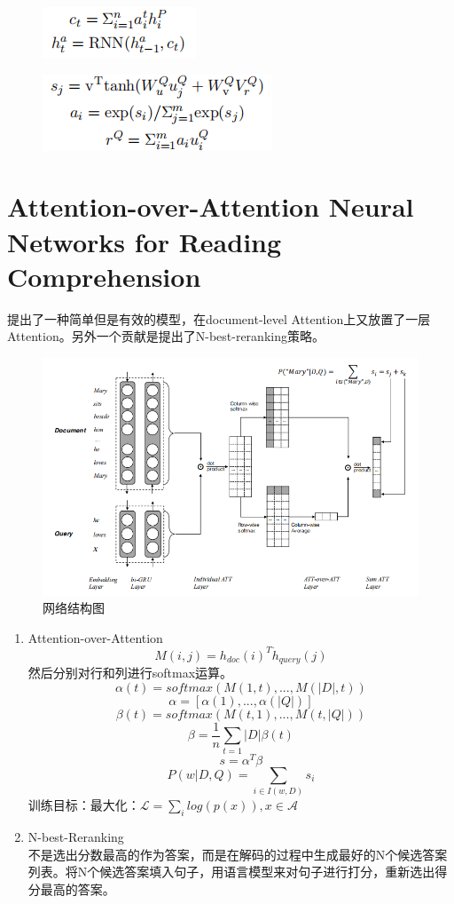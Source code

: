 \documentclass[a4paper,UTF8]{article}
\numberwithin{equation}{section}
\begin{document}
\begin{enumerate}
	\begin{figure}[H]
		\centering
		\includegraphics[]{4-3.png}
	\end{figure}
	\begin{figure}[H]
		\centering
		\includegraphics[]{4-4.png}
	\end{figure}
	
\end{enumerate}
\newpage
\section{Attention-over-Attention Neural Networks for Reading Comprehension}
提出了一种简单但是有效的模型，在document-level Attention上又放置了一层Attention。另外一个贡献是提出了N-best-reranking策略。
\begin{figure}[H]
	\centering
	\includegraphics[width=\textwidth]{5-1.png}
	\caption{网络结构图}
\end{figure}
\begin{enumerate}
	\item Attention-over-Attention\\
	$$M(i,j)=h_{doc}(i)^T\dot h_{query}(j)$$
	然后分别对行和列进行softmax运算。
	$$ \alpha(t)= softmax(M(1, t), ..., M(|D|, t)) $$
	$$ \alpha =[\alpha(1),...,\alpha(|Q|)]$$
	$$\beta(t) = sof tmax(M(t, 1), ..., M(t, |Q|))$$
	$$\beta = \frac{1}{n}\sum_{t=1}{|D|}\beta(t)$$
	$$s=\alpha^T\beta$$
	$$P(w|D, Q) = \sum_{i \in I(w,D)}s_i$$
	训练目标：最大化：$\mathcal{L}=\sum_i log(p(x)),x\in \mathcal{A}$
	\item N-best-Reranking\\
	不是选出分数最高的作为答案，而是在解码的过程中生成最好的N个候选答案列表。将N个候选答案填入句子，用语言模型来对句子进行打分，重新选出得分最高的答案。
\end{enumerate}
\end{document}
